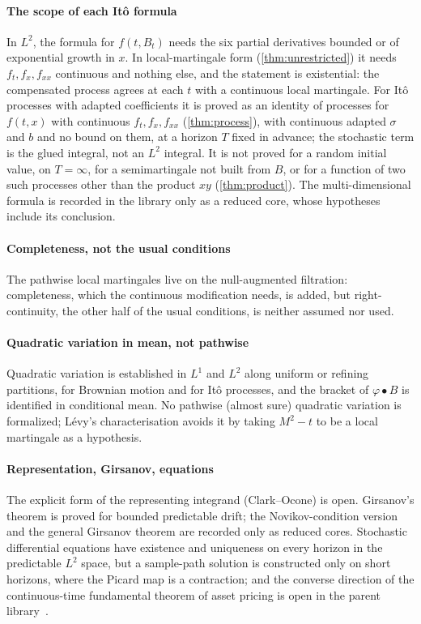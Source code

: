 \documentclass[11pt]{article}
\newcommand{\bulletB}{\mathbin{\bullet}}
\begin{document}
\paragraph{The scope of each It\^o formula}
In $L^2$, the formula for $f(t,B_t)$ needs the six partial derivatives bounded or of exponential growth in $x$. In
local-martingale form (\cref{thm:unrestricted}) it needs $f_t,f_x,f_{xx}$ continuous and nothing else, and the
statement is existential: the compensated process agrees at each $t$ with a continuous local martingale. For It\^o
processes with adapted coefficients it is proved as an identity of processes for $f(t,x)$ with continuous $f_t,f_x,f_{xx}$
(\cref{thm:process}), with continuous adapted $\sigma$ and $b$ and no bound on them, at a horizon $T$ fixed in
advance; the stochastic term is the glued integral, not an $L^2$ integral. It is not proved for a random
initial value, on $T=\infty$, for a semimartingale not built from $B$, or for a function of two such processes other
than the product $xy$ (\cref{thm:product}). The multi-dimensional formula is recorded in the library only as a reduced
core, whose hypotheses include its conclusion.

\paragraph{Completeness, not the usual conditions}
The pathwise local martingales live on the null-augmented filtration: completeness, which the continuous modification
needs, is added, but right-continuity, the other half of the usual conditions, is neither assumed nor used.

\paragraph{Quadratic variation in mean, not pathwise}
Quadratic variation is established in $L^1$ and $L^2$ along uniform or refining partitions, for Brownian motion and
for It\^o processes, and the bracket of $\varphi\bulletB B$ is identified in conditional mean. No pathwise (almost sure)
quadratic variation is formalized; L\'evy's characterisation avoids it by taking $M^2-t$ to be a local martingale as a
hypothesis.

\paragraph{Representation, Girsanov, equations}
The explicit form of the representing integrand (Clark--Ocone) is open. Girsanov's theorem is proved for bounded
predictable drift; the Novikov-condition version and the general Girsanov theorem are recorded only as reduced cores.
Stochastic differential equations have existence and uniqueness on every horizon in the predictable $L^2$ space, but
a sample-path solution is constructed only on short horizons, where the Picard map is a contraction; and the
converse direction of the continuous-time fundamental theorem of asset pricing is open in the parent
library~\cite{CoelhoFTAP}.
\end{document}
